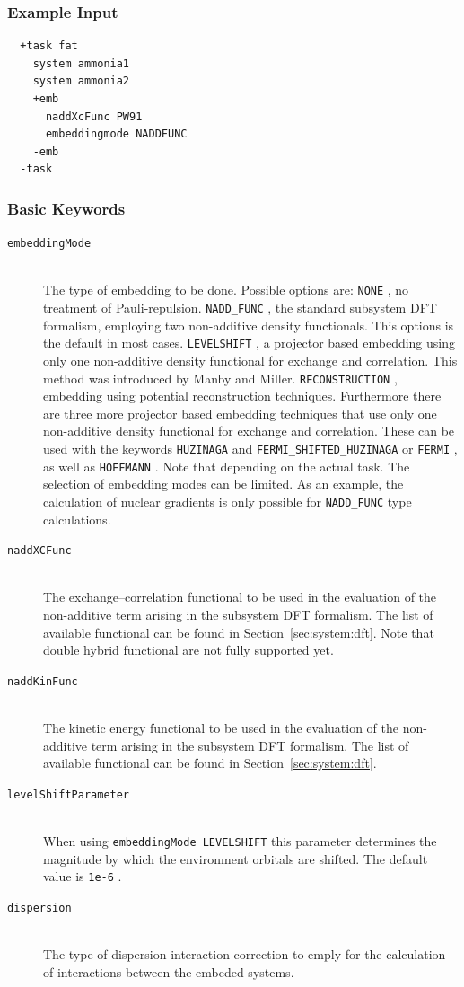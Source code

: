 \documentclass[bibliography=totocnumbered,a4paper,10pt,oneside]{scrbook}
\newcommand{\ttt}[1]{%
  \begingroup\setlength{\fboxsep}{1pt}%
  \colorbox{serenity-green!30}{\texttt{\hspace*{2pt}\vphantom{(g}#1\hspace*{2pt}}}%
  \endgroup
}
\begin{document}
\subsubsection{Example Input}
\begin{lstlisting}
  +task fat
    system ammonia1
    system ammonia2
    +emb
      naddXcFunc PW91
      embeddingmode NADDFUNC
    -emb
  -task
\end{lstlisting}
\subsubsection{Basic Keywords}
\begin{description}
  \item [\texttt{embeddingMode}]\hfill \\
    The type of embedding to be done. Possible options are:
    \ttt{NONE}, no treatment of Pauli-repulsion.
    \ttt{NADD\_FUNC}, the standard subsystem DFT formalism, employing two non-additive density functionals.
    This options is the default in most cases.
    \ttt{LEVELSHIFT}, a projector based embedding using only one non-additive density functional for exchange
    and correlation. This method was introduced by Manby and Miller.
    \ttt{RECONSTRUCTION}, embedding using potential reconstruction techniques.
    Furthermore there are three more projector based embedding techniques that use only one non-additive
    density functional for exchange and correlation. These can be used with the keywords \ttt{HUZINAGA} and
    \ttt{FERMI\_SHIFTED\_HUZINAGA} or \ttt{FERMI}, as well as \ttt{HOFFMANN}.
    Note that depending on the actual task. The selection of embedding modes can be limited. As an example,
    the calculation of nuclear gradients is only possible for \ttt{NADD\_FUNC} type calculations.
  \item [\texttt{naddXCFunc}]\hfill \\
    The exchange--correlation functional to be used in the evaluation of the non-additive term arising in the
    subsystem DFT formalism. The list of available functional can be found in Section~\ref{sec:system:dft}.
    Note that double hybrid functional are not fully supported yet. 
  \item [\texttt{naddKinFunc}]\hfill \\
    The kinetic energy functional to be used in the evaluation of the non-additive term arising in the
    subsystem DFT formalism. The list of available functional can be found in Section~\ref{sec:system:dft}.
  \item [\texttt{levelShiftParameter}]\hfill \\
    When using \ttt{embeddingMode LEVELSHIFT} this parameter determines the magnitude by which the environment
    orbitals are shifted. The default value is \ttt{1e-6}.
  \item [\texttt{dispersion}]\hfill \\
    The type of dispersion interaction correction to emply for the calculation of interactions between the
    embeded systems.
\end{description}
\end{document}
